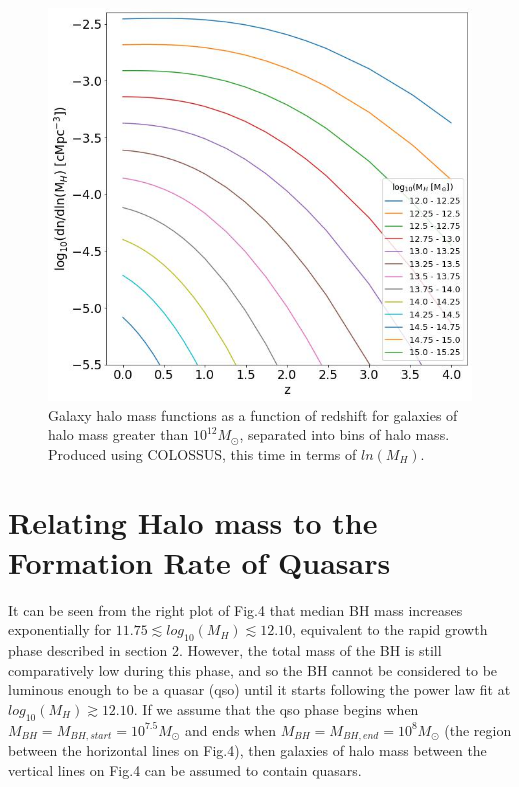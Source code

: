 \documentclass[12pt, twocolumn]{revtex4}    %
\begin{document}
\begin{figure}[H]
\centering
\includegraphics[width=\linewidth]{Mass_Function_2.jpeg}
\caption{Galaxy halo mass functions as a function of redshift for galaxies of halo mass greater than $10^{12}M_\odot$, separated into bins of halo mass. Produced using COLOSSUS, this time in terms of $ln(M_H)$.}
\label{fig:3}
\end{figure}


\section{Relating Halo mass to the Formation Rate of Quasars}

It can be seen from the right plot of Fig.4 that median BH mass increases exponentially for $11.75 \lesssim log_{10}(M_H) \lesssim 12.10$, equivalent to the rapid growth phase described in section 2. However, the total mass of the BH is still comparatively low during this phase, and so the BH cannot be considered to be luminous enough to be a quasar (qso) until it starts following the power law fit at $log_{10}(M_H) \gtrsim 12.10$. If we assume that the qso phase begins when $M_{BH}=M_{BH,start}=10^{7.5}M_\odot$ and ends when $M_{BH}=M_{BH,end}=10^8M_\odot$ (the region between the horizontal lines on Fig.4), then galaxies of halo mass between the vertical lines on Fig.4 can be assumed to contain quasars.

\onecolumngrid
\end{document}
